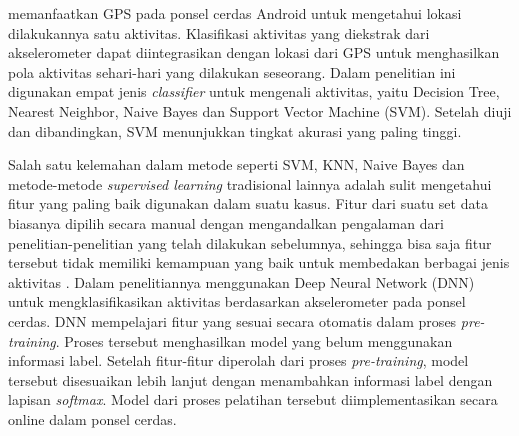 \Textcite{Chiang-201413} memanfaatkan GPS pada ponsel cerdas Android untuk mengetahui lokasi dilakukannya satu aktivitas. Klasifikasi aktivitas yang diekstrak dari akselerometer dapat diintegrasikan dengan lokasi dari GPS untuk menghasilkan pola aktivitas sehari-hari yang dilakukan seseorang. Dalam penelitian ini digunakan empat jenis \textit{classifier} untuk mengenali aktivitas, yaitu Decision Tree, Nearest Neighbor, Naive Bayes dan Support Vector Machine (SVM). Setelah diuji dan dibandingkan, SVM menunjukkan tingkat akurasi yang paling tinggi.

Salah satu kelemahan dalam metode seperti SVM, KNN, Naive Bayes dan metode-metode \textit{supervised learning} tradisional lainnya adalah sulit mengetahui fitur yang paling baik digunakan dalam suatu kasus. Fitur dari suatu set data biasanya dipilih secara manual dengan mengandalkan pengalaman dari penelitian-penelitian yang telah dilakukan sebelumnya, sehingga bisa saja fitur tersebut tidak memiliki kemampuan yang baik untuk membedakan berbagai jenis aktivitas \Textcite{zhang-2015}. Dalam penelitiannya \citeauthor{zhang-2015} menggunakan Deep Neural Network (DNN) untuk mengklasifikasikan aktivitas berdasarkan akselerometer pada ponsel cerdas. DNN mempelajari fitur yang sesuai secara otomatis dalam proses \textit{pre-training}. Proses tersebut menghasilkan model yang belum menggunakan informasi label. Setelah fitur-fitur diperolah dari proses \textit{pre-training}, model tersebut disesuaikan lebih lanjut dengan menambahkan informasi label dengan lapisan \textit{softmax}. Model dari proses pelatihan tersebut diimplementasikan secara online dalam ponsel cerdas.

